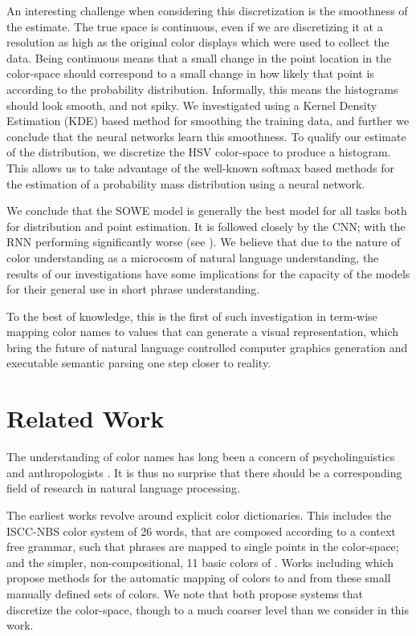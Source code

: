 \documentclass[]{book}
\newcommand{\parencite}{\citep}
\newcommand{\textcite}{\citet}
\newcommand{\datapairs}{$\langle\text{color-name},\,(h,s,v)\rangle$}
\begin{document}
An interesting challenge when considering this discretization is the smoothness of the estimate.
The true space is continuous, even if we are discretizing it at a resolution as high as the original color displays which were used to collect the data.
Being continuous means that a small change in the point location in the color-space should correspond to a small change in how likely that point is according to the probability distribution.
Informally, this means the histograms should look smooth, and not spiky.
We investigated using a Kernel Density Estimation (KDE) based method for smoothing the training data, and further we conclude that the neural networks learn this smoothness.
To qualify our estimate of the distribution, we discretize the HSV color-space to produce a histogram.
This allows us to take advantage of the well-known softmax based methods for the estimation of a probability mass distribution using a neural network.


We conclude that the SOWE model is generally the best model for all tasks both for distribution and point estimation.
It is followed closely by the CNN; with the RNN performing significantly worse (see ).
We believe that due to the nature of color understanding as a microcosm of natural language understanding, the results of our investigations have some implications for the capacity of the models for their general use in short phrase understanding.

To the best of knowledge, this is the first of such investigation in term-wise mapping color names to values that can generate a visual representation, which bring the future of natural language controlled computer graphics generation and executable semantic parsing one step closer to reality.  


\section{Related Work}\label{sec:related-work}
The understanding of color names has long been a concern of psycholinguistics and anthropologists \parencite{berlin1969basic,heider1972universals,HEIDER1972337,mylonas2015use}.
It is thus no surprise that there should be a corresponding field of research in natural language processing.

The earliest works revolve around explicit color dictionaries.
This includes the ISCC-NBS color system \parencite{kelly1955iscc} of 26 words, that are composed according to a context free grammar, such that phrases are mapped to single points in the color-space;
and the simpler, non-compositional, 11 basic colors of \textcite{berlin1969basic}.
Works including \textcite{Berk:1982:HFS:358589.358606,conway1992experimental,ele1994computational, mojsilovic2005computational, menegaz2007discrete,van2009learning} which propose methods for the automatic mapping of colors to and from these small manually defined sets of colors.
We note that \textcite{menegaz2007discrete,van2009learning} both propose systems that discretize the color-space, though to a much coarser level than we consider in this work.
\end{document}
